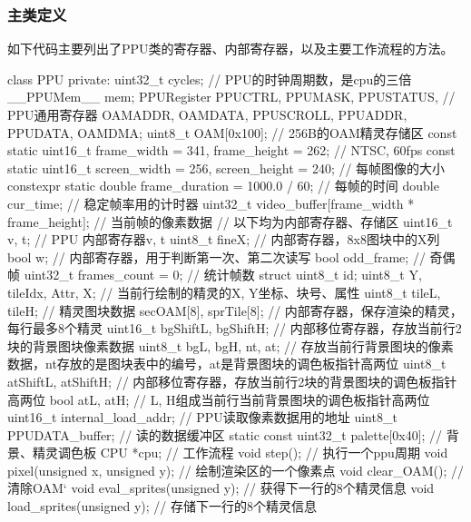 \documentclass[a4paper]{ltxdoc}
\begin{document}
{\subsubsection{主类定义}
如下代码主要列出了PPU类的寄存器、内部寄存器，以及主要工作流程的方法。
\begin{cppcode}
class PPU {
private:
	uint32_t cycles; // PPU的时钟周期数，是cpu的三倍
	__PPUMem__ mem;
	PPURegister PPUCTRL, PPUMASK, PPUSTATUS, // PPU通用寄存器
				OAMADDR, OAMDATA, PPUSCROLL,
				PPUADDR, PPUDATA, OAMDMA;
	uint8_t OAM[0x100]; // 256B的OAM精灵存储区
	const static uint16_t frame_width = 341, frame_height = 262; // NTSC, 60fps
	const static uint16_t screen_width = 256, screen_height = 240; // 每帧图像的大小
	constexpr static double frame_duration = 1000.0 / 60; // 每帧的时间
	double cur_time; // 稳定帧率用的计时器
	uint32_t video_buffer[frame_width * frame_height]; // 当前帧的像素数据
	// 以下均为内部寄存器、存储区
	uint16_t v, t;             // PPU 内部寄存器v, t
	uint8_t fineX;             // 内部寄存器，8x8图块中的X列
	bool w;                    // 内部寄存器，用于判断第一次、第二次读写
	bool odd_frame;            // 奇偶帧
	uint32_t frames_count = 0; // 统计帧数
	struct {
		uint8_t id;
		uint8_t Y, tileIdx, Attr, X;     // 当前行绘制的精灵的X, Y坐标、块号、属性
		uint8_t tileL, tileH;            // 精灵图块数据
	} secOAM[8], sprTile[8];             // 内部寄存器，保存渲染的精灵，每行最多8个精灵
	uint16_t bgShiftL, bgShiftH;         // 内部移位寄存器，存放当前行2块的背景图块像素数据
	uint8_t bgL, bgH, nt, at;            // 存放当前行背景图块的像素数据，nt存放的是图块表中的编号，at是背景图块的调色板指针高两位
	uint8_t atShiftL, atShiftH;          // 内部移位寄存器，存放当前行2块的背景图块的调色板指针高两位
	bool atL, atH;                       // L, H组成当前行当前背景图块的调色板指针高两位
	uint16_t internal_load_addr;         // PPU读取像素数据用的地址
	uint8_t PPUDATA_buffer;              // 读的数据缓冲区
	static const uint32_t palette[0x40]; // 背景、精灵调色板
	CPU *cpu;
	// 工作流程
	void step();                         // 执行一个ppu周期
	void pixel(unsigned x, unsigned y);  // 绘制渲染区的一个像素点
	void clear_OAM();                    // 清除OAM`
	void eval_sprites(unsigned y);       // 获得下一行的8个精灵信息
	void load_sprites(unsigned y);       // 存储下一行的8个精灵信息
}
\end{cppcode}
}
\end{document}
